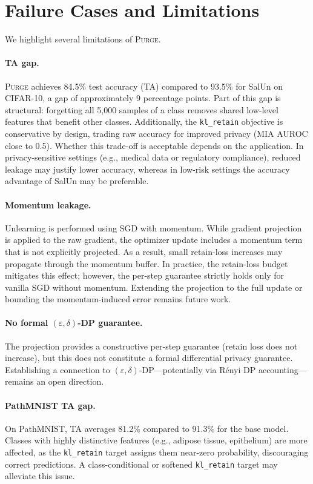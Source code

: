 \documentclass[10pt,twocolumn]{article}
\newcommand{\ours}{\textsc{Purge}}
\newcommand{\klr}{\texttt{kl\_retain}}
\begin{document}
\section{Failure Cases and Limitations}\label{sec:limitations}

We highlight several limitations of \ours{}.

\paragraph{TA gap.}
\ours{} achieves 84.5\% test accuracy (TA) compared to 93.5\% for SalUn on CIFAR-10, a gap of approximately 9 percentage points.
Part of this gap is structural: forgetting all 5{,}000 samples of a class removes shared low-level features that benefit other classes.
Additionally, the \klr{} objective is conservative by design, trading raw accuracy for improved privacy (MIA AUROC close to 0.5).
Whether this trade-off is acceptable depends on the application.
In privacy-sensitive settings (e.g., medical data or regulatory compliance), reduced leakage may justify lower accuracy, whereas in low-risk settings the accuracy advantage of SalUn may be preferable.

\paragraph{Momentum leakage.}
Unlearning is performed using SGD with momentum.
While gradient projection is applied to the raw gradient, the optimizer update includes a momentum term that is not explicitly projected.
As a result, small retain-loss increases may propagate through the momentum buffer.
In practice, the retain-loss budget mitigates this effect; however, the per-step guarantee strictly holds only for vanilla SGD without momentum.
Extending the projection to the full update or bounding the momentum-induced error remains future work.

\paragraph{No formal $(\varepsilon, \delta)$-DP guarantee.}
The projection provides a constructive per-step guarantee (retain loss does not increase), but this does not constitute a formal differential privacy guarantee.
Establishing a connection to $(\varepsilon, \delta)$-DP—potentially via R\'enyi DP accounting—remains an open direction.

\paragraph{PathMNIST TA gap.}
On PathMNIST, TA averages 81.2\% compared to 91.3\% for the base model.
Classes with highly distinctive features (e.g., adipose tissue, epithelium) are more affected, as the \klr{} target assigns them near-zero probability, discouraging correct predictions.
A class-conditional or softened \klr{} target may alleviate this issue.
\end{document}
